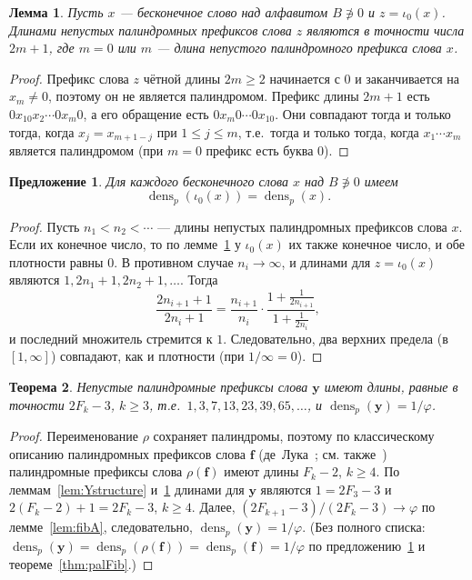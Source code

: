 \documentclass[a4paper,14pt]{extreport}
\theoremstyle{plain}
\newtheorem{theorem}{Теорема}[section]
\newtheorem{lemma}{Лемма}[section]
\newtheorem{proposition}[theorem]{Предложение}
\theoremstyle{definition}
\theoremstyle{remark}
\begin{document}
\begin{lemma}\label{lem:interleave}
	Пусть $x$ --- бесконечное слово над алфавитом $B\not\ni0$ и $z=\iota_0(x)$.
	Длинами непустых палиндромных префиксов слова $z$ являются в точности числа $2m+1$,
	где $m=0$ или $m$ --- длина непустого палиндромного префикса слова $x$.
\end{lemma}
\begin{proof}
	Префикс слова $z$ чётной длины $2m\ge2$ начинается с $0$ и заканчивается на $x_m\ne0$, поэтому он не является палиндромом.
	Префикс длины $2m+1$ есть $0x_10x_2\cdots0x_m0$, а его обращение есть $0x_m0\cdots0x_10$.
	Они совпадают тогда и только тогда, когда $x_j=x_{m+1-j}$ при $1\le j\le m$, т.е.\ тогда и только тогда, когда $x_1\cdots x_m$ является палиндромом
	(при $m=0$ префикс есть буква $0$).
\end{proof}

\begin{proposition}\label{prop:insertion}
	Для каждого бесконечного слова $x$ над $B\not\ni0$ имеем
	\begin{equation}
		\operatorname{dens}_p(\iota_0(x))=\operatorname{dens}_p(x).
	\end{equation}
\end{proposition}
\begin{proof}
	Пусть $n_1<n_2<\cdots$ --- длины непустых палиндромных префиксов слова $x$.
	Если их конечное число, то по лемме~\ref{lem:interleave} у $\iota_0(x)$ их также конечное число,
	и обе плотности равны $0$. В противном случае $n_i\to\infty$, и длинами для $z=\iota_0(x)$ являются $1,2n_1+1,2n_2+1,\dots$.
	Тогда
	\begin{equation}
		\frac{2n_{i+1}+1}{2n_i+1}=\frac{n_{i+1}}{n_i}\cdot\frac{1+\frac1{2n_{i+1}}}{1+\frac1{2n_i}},
	\end{equation}
	и последний множитель стремится к $1$. Следовательно, два верхних предела (в $[1,\infty]$) совпадают,
	как и плотности (при $1/\infty=0$).
\end{proof}

\begin{theorem}\label{thm:Ypal}
	Непустые палиндромные префиксы слова $\mathbf y$ имеют длины, равные в точности $2F_k-3$, $k\ge3$,
	т.е.\ $1,3,7,13,23,39,65,\dots$, и $\operatorname{dens}_p(\mathbf y)=1/\varphi$.
\end{theorem}
\begin{proof}
	Переименование $\rho$ сохраняет палиндромы, поэтому по классическому описанию палиндромных префиксов
	слова $\mathbf f$ (де~Лука~\cite{DeLuca1997}; см. также~\cite{Droubay}) палиндромные префиксы слова $\rho(\mathbf f)$ имеют длины $F_k-2$, $k\ge4$.
	По леммам~\ref{lem:Ystructure} и~\ref{lem:interleave} длинами для $\mathbf y$ являются $1=2F_3-3$ и
	$2(F_k-2)+1=2F_k-3$, $k\ge4$. Далее,
	$(2F_{k+1}-3)/(2F_k-3)\to\varphi$ по лемме~\ref{lem:fibA}, следовательно, $\operatorname{dens}_p(\mathbf y)=1/\varphi$.
	(Без полного списка: $\operatorname{dens}_p(\mathbf y)=\operatorname{dens}_p(\rho(\mathbf f))=\operatorname{dens}_p(\mathbf f)=1/\varphi$
	по предложению~\ref{prop:insertion} и теореме~\ref{thm:palFib}.)
\end{proof}
\end{document}
